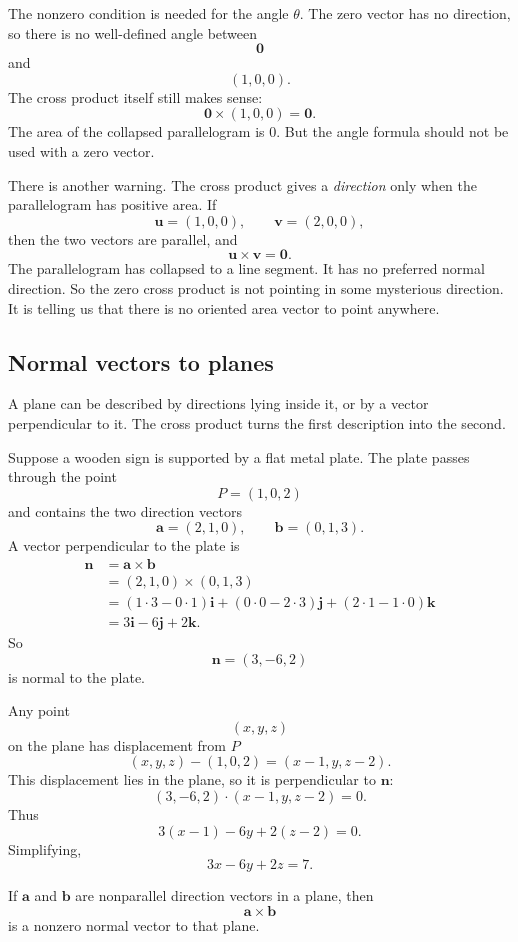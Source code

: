 The nonzero condition is needed for the angle \(\theta\).  The zero vector has no
direction, so there is no well-defined angle between
\[
    \mathbf 0
\]
and
\[
    (1,0,0).
\]
The cross product itself still makes sense:
\[
    \mathbf 0\times(1,0,0)=\mathbf 0.
\]
The area of the collapsed parallelogram is \(0\).  But the angle formula should not be
used with a zero vector.

There is another warning.  The cross product gives a \emph{direction} only when the
parallelogram has positive area.  If
\[
    \mathbf u=(1,0,0),
    \qquad
    \mathbf v=(2,0,0),
\]
then the two vectors are parallel, and
\[
    \mathbf u\times\mathbf v=\mathbf 0.
\]
The parallelogram has collapsed to a line segment.  It has no preferred normal
direction.  So the zero cross product is not pointing in some mysterious direction.  It is
telling us that there is no oriented area vector to point anywhere.

\subsection{Normal vectors to planes}

A plane can be described by directions lying inside it, or by a vector perpendicular to
it.  The cross product turns the first description into the second.

Suppose a wooden sign is supported by a flat metal plate.  The plate passes through
the point
\[
    P=(1,0,2)
\]
and contains the two direction vectors
\[
    \mathbf a=(2,1,0),
    \qquad
    \mathbf b=(0,1,3).
\]
A vector perpendicular to the plate is
\[
\begin{aligned}
\mathbf n
&=
\mathbf a\times\mathbf b\\
&=
(2,1,0)\times(0,1,3)\\
&=
(1\cdot3-0\cdot1)\mathbf i
+(0\cdot0-2\cdot3)\mathbf j
+(2\cdot1-1\cdot0)\mathbf k\\
&=
3\mathbf i-6\mathbf j+2\mathbf k.
\end{aligned}
\]
So
\[
    \mathbf n=(3,-6,2)
\]
is normal to the plate.

Any point
\[
    (x,y,z)
\]
on the plane has displacement from \(P\)
\[
    (x,y,z)-(1,0,2)=(x-1,y,z-2).
\]
This displacement lies in the plane, so it is perpendicular to \(\mathbf n\):
\[
    (3,-6,2)\cdot(x-1,y,z-2)=0.
\]
Thus
\[
    3(x-1)-6y+2(z-2)=0.
\]
Simplifying,
\[
\boxed{
    3x-6y+2z=7.
}
\]

\begin{theorem}
If \(\mathbf a\) and \(\mathbf b\) are nonparallel direction vectors in a plane, then
\[
    \mathbf a\times\mathbf b
\]
is a nonzero normal vector to that plane.
\end{theorem}


